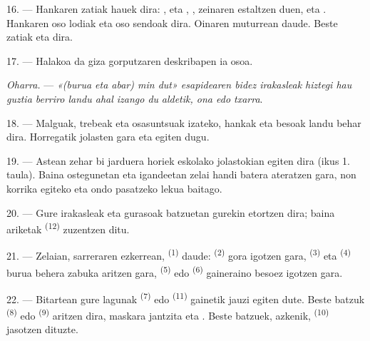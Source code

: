 16. --- Hankaren zatiak hauek dira: ,  eta
, , zeinaren 
 estaltzen duen,  eta .
Hankaren  oso lodiak eta oso sendoak dira. Oinaren muturrean
 daude. Beste zatiak  eta  dira.

17. --- Halakoa da giza gorputzaren deskribapen ia osoa.

\textit{Oharra.} --- \textit{«(burua eta abar) min dut» esapidearen bidez
irakasleak hiztegi hau guztia berriro landu ahal izango du}  \textit{aldetik, ona edo txarra}.

\VUsaut{5.0mm}
\VUsaut{2.4mm}
\VUsaut{3.0mm}

18. --- Malguak, trebeak eta osasuntsuak izateko, hankak eta besoak landu behar
dira. Horregatik jolasten gara eta  egiten dugu.

19. --- Astean zehar bi jarduera horiek eskolako jolastokian egiten dira (ikus 1.
taula). Baina ostegunetan eta igandeetan zelai handi batera ateratzen gara, non
korrika egiteko eta ondo pasatzeko lekua baitago.

20. --- Gure irakasleak eta gurasoak batzuetan gurekin etortzen dira; baina
ariketak  \textsuperscript{(12)} zuzentzen ditu.

21. --- Zelaian, sarreraren ezkerrean, 
\textsuperscript{(1)} daude:  \textsuperscript{(2)} gora
igotzen gara,  \textsuperscript{(3)} eta 
\textsuperscript{(4)} burua behera zabuka aritzen gara, 
\textsuperscript{(5)} edo  \textsuperscript{(6)}
gaineraino besoez igotzen gara.

22. --- Bitartean gure lagunak  \textsuperscript{(7)}
edo  \textsuperscript{(11)} gainetik jauzi egiten dute. Beste
batzuk  \textsuperscript{(8)} edo 
\textsuperscript{(9)} aritzen dira, maskara jantzita eta .
Beste batzuek, azkenik,  \textsuperscript{(10)} jasotzen
dituzte.

\VUsaut{4.6mm}
\VUsaut{3.0mm}

